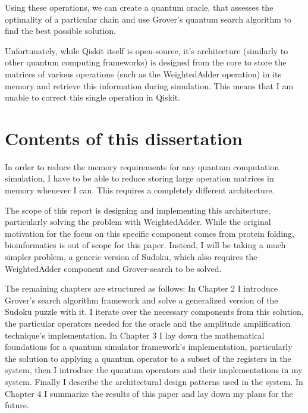 Using these operations, we can create a quantum oracle, that assesses the optimality of a particular chain and use Grover's quantum search algorithm to find the best possible solution.

Unfortunately, while Qiskit itself is open-source, it's architecture (similarly to other quantum computing frameworks) is designed from the core to store the matrices of various operations (such as the WeightedAdder operation) in its memory and retrieve this information during simulation. This means that I am unable to correct this single operation in Qiskit.

\section{Contents of this dissertation}

In order to reduce the memory requirements for any quantum computation simulation, I have to be able to reduce storing large operation matrices in memory whenever I can. This requires a completely different architecture.

The scope of this report is designing and implementing this architecture, particularly solving the problem with WeightedAdder. While the original motivation for the focus on this specific component comes from protein folding, bioinformatics is out of scope for this paper. Instead, I will be taking a much simpler problem, a generic version of Sudoku, which also requires the WeightedAdder component and Grover-search to be solved.

The remaining chapters are structured as follows: In Chapter 2 I introduce Grover's search algorithm framework and solve a generalized version of the Sudoku puzzle with it. I iterate over the necessary components from this solution, the particular operators needed for the oracle and the amplitude amplification technique's implementation. In Chapter 3 I lay down the mathematical foundations for a quantum simulator framework's implementation, particularly the solution to applying a quantum operator to a subset of the registers in the system, then I introduce the quantum operators and their implementations in my system. Finally I describe the architectural design patterns used in the system. In Chapter 4 I summarize the results of this paper and lay down my plans for the future.
